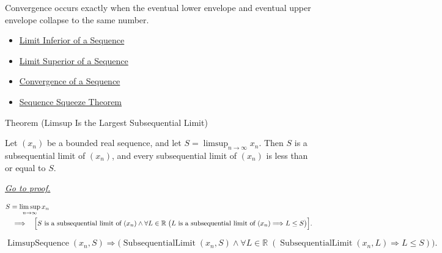 \begin{remark*}[Interpretation]
Convergence occurs exactly when the eventual lower envelope and eventual
upper envelope collapse to the same number.
\end{remark*}

\begin{remark*}[Dependencies]\hfill
\begin{itemize}
  \item \hyperref[def:liminf-sequence]{Limit Inferior of a Sequence}
  \item \hyperref[def:limsup-sequence]{Limit Superior of a Sequence}
  \item \hyperref[def:convergent-sequence]{Convergence of a Sequence}
  \item \hyperref[thm:sequence-squeeze-theorem]{Sequence Squeeze Theorem}
\end{itemize}
\end{remark*}


\begin{theorembox}{Theorem (Limsup Is the Largest Subsequential Limit)}
\begin{theorem}
\label{thm:limsup-largest-subsequential-limit}
Let $(x_n)$ be a bounded real sequence, and let
$S=\limsup_{n\to\infty}x_n$. Then $S$ is a subsequential limit of
$(x_n)$, and every subsequential limit of $(x_n)$ is less than or equal
to $S$.

\smallskip
\noindent
\hyperref[prf:limsup-largest-subsequential-limit]{\textit{Go to proof.}}
\end{theorem}
\end{theorembox}

\begin{remark*}
\[
\begin{aligned}
&S=\limsup_{n\to\infty}x_n\\
&\quad\Longrightarrow\quad
\Bigl[
  S\text{ is a subsequential limit of }(x_n)
  \land
  \forall L\in\mathbb{R}\;
  \bigl(L\text{ is a subsequential limit of }(x_n)\Longrightarrow L\le S\bigr)
\Bigr].
\end{aligned}
\]
\end{remark*}

\begin{remark*}
\[
\operatorname{LimsupSequence}(x_n,S)
\Longrightarrow
\bigl(
  \operatorname{SubsequentialLimit}(x_n,S)
  \land
  \forall L\in\mathbb{R}\;
  (\operatorname{SubsequentialLimit}(x_n,L)\Longrightarrow L\le S)
\bigr).
\]
\end{remark*}

